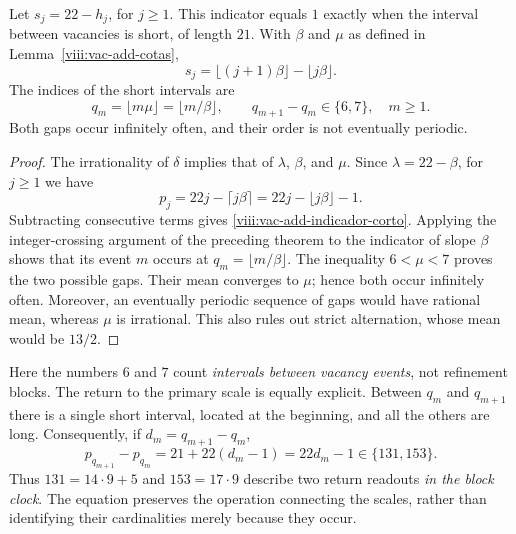 \begin{theorem}
\label{viii:vac-add-teorema-secundario}
Let \(s_j=22-h_j\), for \(j\geq1\). This indicator equals \(1\) exactly when the interval between vacancies is short, of length \(21\). With \(\beta\) and \(\mu\) as defined in Lemma~\ref{viii:vac-add-cotas},
\begin{equation}
 s_j=\lfloor(j+1)\beta\rfloor-\lfloor j\beta\rfloor.
 \label{viii:vac-add-indicador-corto}
\end{equation}
The indices of the short intervals are
\begin{equation}
 q_m=\lfloor m\mu\rfloor=\lfloor m/\beta\rfloor,
 \qquad q_{m+1}-q_m\in\{6,7\},\quad m\geq1.
 \label{viii:vac-add-posiciones-cortos}
\end{equation}
Both gaps occur infinitely often, and their order is not eventually periodic.
\end{theorem}
\begin{proof}
The irrationality of \(\delta\) implies that of \(\lambda\), \(\beta\), and \(\mu\). Since \(\lambda=22-\beta\), for \(j\geq1\) we have
\[
 p_j=22j-\lceil j\beta\rceil
     =22j-\lfloor j\beta\rfloor-1.
\]
Subtracting consecutive terms gives \eqref{viii:vac-add-indicador-corto}. Applying the integer-crossing argument of the preceding theorem to the indicator of slope \(\beta\) shows that its event \(m\) occurs at \(q_m=\lfloor m/\beta\rfloor\). The inequality \(6<\mu<7\) proves the two possible gaps. Their mean converges to \(\mu\); hence both occur infinitely often. Moreover, an eventually periodic sequence of gaps would have rational mean, whereas \(\mu\) is irrational. This also rules out strict alternation, whose mean would be \(13/2\).
\end{proof}

Here the numbers \(6\) and \(7\) count \emph{intervals between vacancy events}, not refinement blocks. The return to the primary scale is equally explicit. Between \(q_m\) and \(q_{m+1}\) there is a single short interval, located at the beginning, and all the others are long. Consequently, if \(d_m=q_{m+1}-q_m\),
\begin{equation}
 p_{q_{m+1}}-p_{q_m}=21+22(d_m-1)=22d_m-1
 \in\{131,153\}.
 \label{viii:vac-add-retorno-bloques}
\end{equation}
Thus \(131=14\cdot9+5\) and \(153=17\cdot9\) describe two return readouts \emph{in the block clock}. The equation preserves the operation connecting the scales, rather than identifying their cardinalities merely because they occur.

